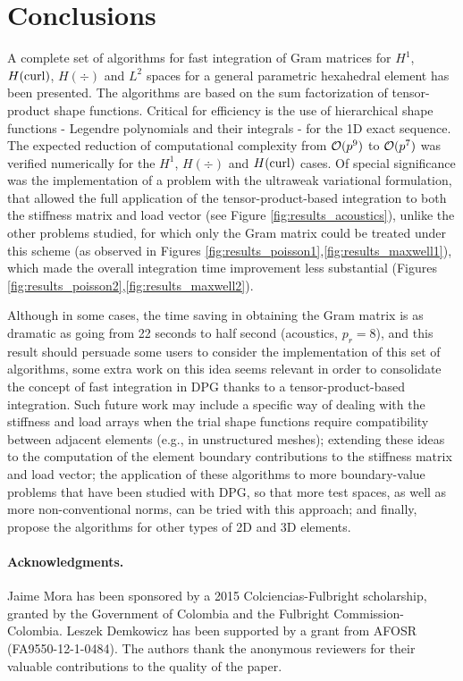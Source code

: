 \section{Conclusions}

A complete set of algorithms for fast integration of Gram matrices for $H^1$, $H(\operatorname{curl})$, $H(\div)$ and $L^2$ spaces for a general parametric hexahedral element has been presented. The algorithms are based on the sum factorization of tensor-product shape functions. Critical for efficiency is the use of hierarchical shape functions - Legendre polynomials and their integrals - for the 1D exact sequence. The expected reduction of computational complexity from $\mathcal{O}(p^9)$ to $\mathcal{O}(p^7)$ was verified numerically for the $H^1$, $H(\div)$ and $H(\operatorname{curl})$ cases. Of special significance was the implementation of a problem with the ultraweak variational formulation, that allowed the full application of the tensor-product-based integration to both the stiffness matrix and load vector {\color{blue}(see Figure \ref{fig:results_acoustics}), unlike the other problems studied, for which only the Gram matrix could be treated under this scheme (as observed in Figures \ref{fig:results_poisson1},\ref{fig:results_maxwell1}), which made the overall integration time improvement less substantial (Figures \ref{fig:results_poisson2},\ref{fig:results_maxwell2})}.

Although in some cases, the time saving in obtaining the Gram matrix is as dramatic as going from 22 seconds to half second (acoustics, $p_r=8$), and this result should persuade some users to consider the implementation of this set of algorithms, some extra work on this idea seems relevant in order to consolidate the concept of fast integration in DPG thanks to a tensor-product-based integration. Such future work may include a specific way of dealing with the stiffness and load arrays when the trial shape functions require compatibility between adjacent elements (e.g., in unstructured meshes); extending these ideas to the computation of the element boundary contributions to the stiffness matrix and load vector; the application of these algorithms to more boundary-value problems that have been studied with DPG, so that more test spaces, as well as more non-conventional norms, can be tried with this approach; and finally, propose the algorithms for other types of 2D and 3D elements.

\paragraph{Acknowledgments.}
Jaime Mora has been sponsored by a 2015 Colciencias-Fulbright scholarship, granted by the Government of Colombia and the Fulbright Commission-Colombia. Leszek Demkowicz has been supported by a grant from AFOSR (FA9550-12-1-0484). The authors thank the anonymous reviewers for their valuable contributions to the quality of the paper.